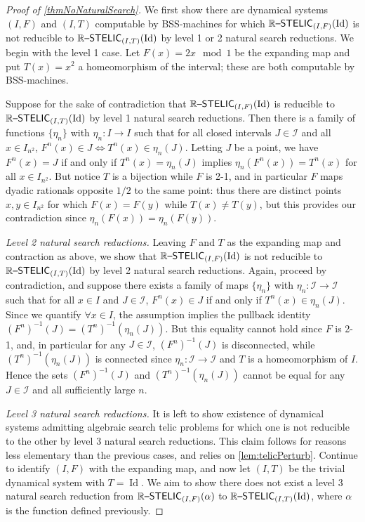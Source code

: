 \documentclass{amsart}
\theoremstyle{theorem}
\theoremstyle{remark}
\DeclareMathOperator{\Id}{Id}
\newcommand{\ccRSTELIC}{\mathbb{R}\textsf{\upshape --STELIC}}
\newcommand{\cI}{\mathcal{I}}
\begin{document}
\begin{proof}[Proof of \cref{thmNoNaturalSearch}]
We first show there are dynamical systems $(I, F)$ and $(I, T)$ computable by BSS-machines for which $\ccRSTELIC_{(I, F)}(\Id)$ is not reducible to $\ccRSTELIC_{(I, T)}(\Id)$ by level 1 or 2 natural search reductions. We begin with the level 1 case. Let $F(x) = 2x\mod 1$ be the expanding map and put $T(x) = x^2$ a homeomorphism of the interval; these are both computable by BSS-machines.

Suppose for the sake of contradiction that $\ccRSTELIC_{(I, F)}(\Id)$ is reducible to $\ccRSTELIC_{(I, T)}(\Id)$ by level 1 natural search reductions.
Then there is a family of functions $\{\eta_n\}$ with $\eta_n:I \rightarrow I$ such that for all closed intervals $J \in \cI$ and all $x \in I_{n^2}$, $F^n(x) \in J \iff T^n(x) \in \eta_n(J)$. Letting $J$ be a point, we have $F^n(x) = J$ if and only if $T^n(x) = \eta_n(J)$ implies $\eta_n(F^n(x)) = T^n(x)$ for all $x \in I_{n^2}$. But notice $T$ is a bijection while $F$ is 2-1, and in particular $F$ maps dyadic rationals opposite $1/2$ to the same point: thus there are distinct points $x, y \in I_{n^2}$ for which $F(x)=F(y)$ while $T(x) \neq T(y)$, but this provides our contradiction since $\eta_n(F(x)) = \eta_n(F(y))$.

\emph{Level 2 natural search reductions.} Leaving $F$ and $T$ as the expanding map and contraction as above, we show that $\ccRSTELIC_{(I, F)}(\Id)$ is not reducible to $\ccRSTELIC_{(I, T)}(\Id)$ by level 2 natural search reductions. Again, proceed by contradiction, and suppose there exists a family of maps $\{\eta_n\}$ with $\eta_n:\cI\rightarrow \cI$ such that for all $x \in I$ and $J \in \cI$, $F^n(x) \in J$ if and only if $T^n(x) \in \eta_n(J)$. Since we quantify $\forall x\in I$, the assumption implies the pullback identity $(F^n)^{-1}(J) = (T^n)^{-1}(\eta_n(J))$. But this equality cannot hold since $F$ is 2-1, and, in particular for any $J \in \cI$, $(F^n)^{-1}(J)$ is disconnected, while $(T^n)^{-1}(\eta_n(J))$ is connected since $\eta_n:\cI\rightarrow \cI$ and $T$ is a homeomorphism of $I$. Hence the sets $(F^n)^{-1}(J)$ and $(T^n)^{-1}(\eta_n(J))$ cannot be equal for any $J \in \cI$ and all sufficiently large $n$.

\emph{Level 3 natural search reductions.} It is left to show existence of dynamical systems admitting algebraic search telic problems for which one is not reducible to the other by level 3 natural search reductions. This claim follows for reasons less elementary than the previous cases, and relies on \cref{lem:telicPerturb}.
Continue to identify $(I, F)$ with the expanding map, and now let $(I, T)$ be the trivial dynamical system with $T = \Id$. We aim to show there does not exist a level 3 natural search reduction from $\ccRSTELIC_{(I, F)}(\alpha)$ to $\ccRSTELIC_{(I, T)}(\Id)$, where $\alpha$ is the function defined previously.


\end{proof}
\end{document}
